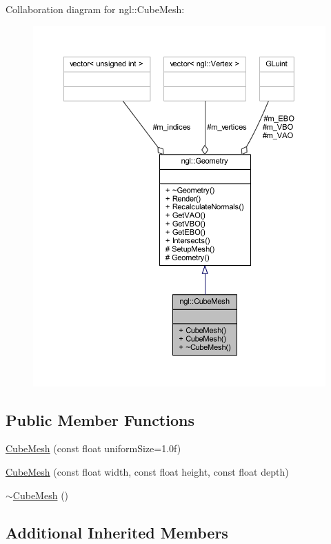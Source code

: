 Collaboration diagram for ngl\+:\+:Cube\+Mesh\+:
\nopagebreak
\begin{figure}[H]
\begin{center}
\leavevmode
\includegraphics[width=350pt]{classngl_1_1_cube_mesh__coll__graph}
\end{center}
\end{figure}
\subsection*{Public Member Functions}
\begin{DoxyCompactItemize}
\item 
\mbox{\hyperlink{classngl_1_1_cube_mesh_a9608d5d198ce8c95adefa430fc7df73a}{Cube\+Mesh}} (const float uniform\+Size=1.\+0f)
\item 
\mbox{\hyperlink{classngl_1_1_cube_mesh_a8890d014e535648be46bbab24456738b}{Cube\+Mesh}} (const float width, const float height, const float depth)
\item 
\mbox{\hyperlink{classngl_1_1_cube_mesh_a5fff912b49d6ca5c9dede14f3dcd951a}{$\sim$\+Cube\+Mesh}} ()
\end{DoxyCompactItemize}
\subsection*{Additional Inherited Members}


